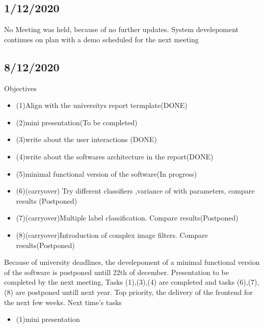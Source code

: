 \documentclass[openany]{article}
\begin{document}
		\subsection{1/12/2020}
			No Meeting was held, because of no further updates. System develepoment continues on plan
			with a demo scheduled for the next meeting
		\subsection{8/12/2020}
			Objectives
			\begin{itemize}
				\item (1)Align with the universitys report termplate(DONE)
				\item (2)mini presentation(To be completed)
				\item (3)write about the user interactions (DONE)
				\item (4)write about the softwares architecture in the report(DONE)
				\item (5)minimal functional version of the software(In progress)
				\item (6)(carryover) Try different classifiers ,variance of with parameters, compare results (Postponed)
				\item (7)(carryover)Multiple label classification. Compare results(Postponed)
				\item (8)(carryover)Introduction of complex image filters. Compare results(Postponed)
			\end{itemize}
			Because of university deadlines, the develepoment of a minimal functional version of the software is postponed untill 22th of december.
			Presentation to be completed by the next meeting, Tasks (1),(3),(4) are completed and tasks (6),(7),(8) are postponed untill next year.
			Top priority, the delivery of the frontend for the next few weeks.
			Next time's tasks
			\begin{itemize}
				\item (1)mini presentation
			\end{itemize}
\end{document}
